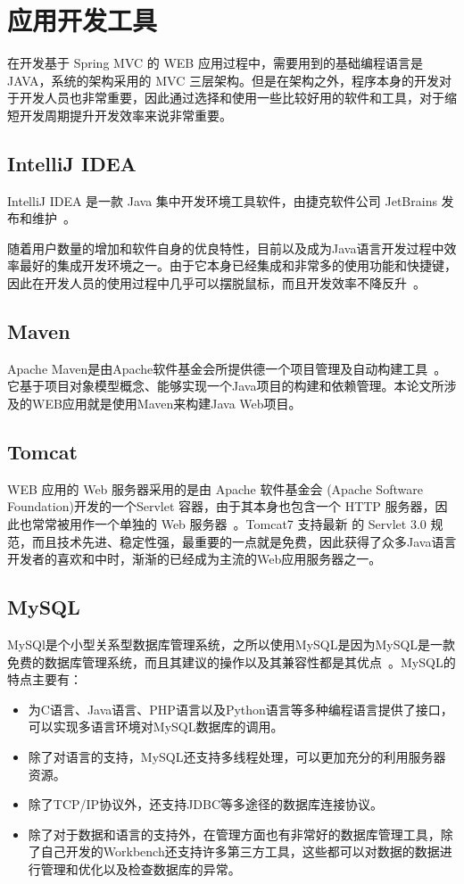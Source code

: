 \section{应用开发工具}
在开发基于 Spring MVC 的 WEB 应用过程中，需要用到的基础编程语言是 JAVA，系统的架构采用的 MVC 三层架构。但是在架构之外，程序本身的开发对于开发人员也非常重要，因此通过选择和使用一些比较好用的软件和工具，对于缩短开发周期提升开发效率来说非常重要。
\subsection{IntelliJ IDEA}
IntelliJ IDEA 是一款 Java 集中开发环境工具软件，由捷克软件公司 JetBrains 发布和维护~\cite{jemerov2008implementing}。

随着用户数量的增加和软件自身的优良特性，目前以及成为Java语言开发过程中效率最好的集成开发环境之一。由于它本身已经集成和非常多的使用功能和快捷键，因此在开发人员的使用过程中几乎可以摆脱鼠标，而且开发效率不降反升~\cite{IDEA维基百科}。
\subsection{Maven}
Apache Maven是由Apache软件基金会所提供德一个项目管理及自动构建工具~\cite{smart2005introduction}。它基于项目对象模型概念、能够实现一个Java项目的构建和依赖管理。本论文所涉及的WEB应用就是使用Maven来构建Java Web项目。
\subsection{Tomcat}
WEB 应用的 Web 服务器采用的是由 Apache 软件基金会 (Apache Software Foundation)开发的一个Servlet 容器，由于其本身也包含一个 HTTP 服务器，因此也常常被用作一个单独的 Web 服务器~\cite{brittain2007tomcat}。Tomcat7 支持最新 的 Servlet 3.0 规范，而且技术先进、稳定性强，最重要的一点就是免费，因此获得了众多Java语言开发者的喜欢和中时，渐渐的已经成为主流的Web应用服务器之一。

\subsection{MySQL}
MySQl是个小型关系型数据库管理系统，之所以使用MySQL是因为MySQL是一款免费的数据库管理系统，而且其建议的操作以及其兼容性都是其优点~\cite{greenspan2001mysql}。MySQL的特点主要有\cite{王川2009农业机械装备信息管理系统的设计和研究}：
\begin{itemize}
\item 为C语言、Java语言、PHP语言以及Python语言等多种编程语言提供了接口，可以实现多语言环境对MySQL数据库的调用。
\item 除了对语言的支持，MySQL还支持多线程处理，可以更加充分的利用服务器资源。
\item 除了TCP/IP协议外，还支持JDBC等多途径的数据库连接协议。
\item 除了对于数据和语言的支持外，在管理方面也有非常好的数据库管理工具，除了自己开发的Workbench还支持许多第三方工具，这些都可以对数据的数据进行管理和优化以及检查数据库的异常。

\end{itemize}
